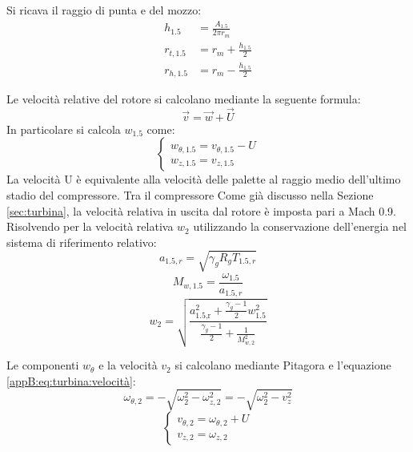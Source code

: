Si ricava il raggio di punta e del mozzo:
\begin{align*}
    h_{1.5} &= \frac{A_{1.5}}{2 \pi r_m} \\[6pt]
    r_{t,1.5} &= r_m + \frac{h_{1.5}}{2} \\[6pt]
r_{h,1.5} &= r_m - \frac{h_{1.5}}{2}
\end{align*}

Le velocità relative del rotore si calcolano mediante la seguente formula:
\begin{equation}
\vec{v} = \vec{w} + \vec{U}
\label{appB:eq:turbina:velocità}
\end{equation}
In particolare si calcola $w_{1.5}$ come:
\begin{equation*}
    \begin{cases}  w_{\theta,1.5} = v_{\theta,1.5} - U \\  w_{z,1.5} = v_{z,1.5} \end{cases}
\end{equation*}
La velocità U è equivalente alla velocità delle palette al raggio medio dell'ultimo stadio del compressore. Tra il compressore 
Come già discusso nella Sezione \ref{sec:turbina}, la velocità relativa in uscita dal rotore è imposta pari a Mach 0.9. Risolvendo per la velocità relativa $w_2$ utilizzando la conservazione dell'energia nel sistema di riferimento relativo:
\begin{equation*}
    a_{1.5,r} = \sqrt{\gamma_gR_gT_{1.5,r}}
\end{equation*}
\begin{equation*}
    M_{w,1.5} = \frac{\omega_{1.5}}{a_{1.5,r}}
\end{equation*}
\begin{equation*}
    w_{2} = \sqrt{\frac{a_{\text{1.5,r}}^2 + \frac{\gamma_g - 1}{2} w_{\text{1.5}}^2}{\frac{\gamma_g - 1}{2} + \frac{1}{M_{w,2}^2}}}
\end{equation*} 

Le componenti $w_\theta$ e la velocità $v_2$ si calcolano mediante Pitagora e l'equazione \eqref{appB:eq:turbina:velocità}:
\begin{equation*}
    \omega_{\theta,2} = -\sqrt{\omega _2^2-\omega_{z,2}^2} = -\sqrt{\omega _2^2-v_{z}^2}
\end{equation*}
\begin{equation*}
    \begin{cases}  v_{\theta,2} = \omega_{\theta,2} + U \\  v_{z,2} = \omega_{z,2} \end{cases}
\end{equation*}
    
